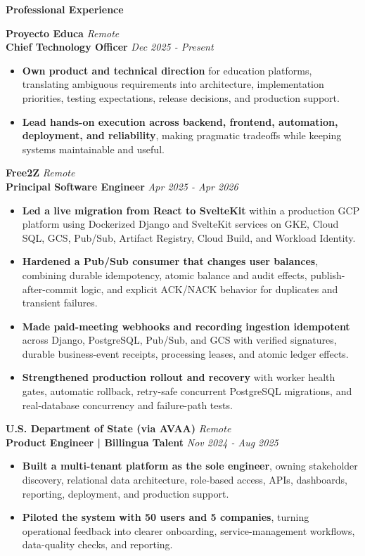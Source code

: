 \documentclass[10pt]{article}
\newcommand{\sectiontitle}[1]{%
    \vspace{3pt}
    \begin{center}
        \textbf{#1}
    \end{center}
    \vspace{-5pt}
}
\begin{document}
\sectiontitle{Professional Experience}
\textbf{Proyecto Educa} \hfill \textit{Remote} \\
\textbf{Chief Technology Officer} \hfill \textit{Dec 2025 - Present}
\begin{itemize}
    \item \textbf{Own product and technical direction} for education platforms, translating ambiguous requirements into architecture, implementation priorities, testing expectations, release decisions, and production support.
    \item \textbf{Lead hands-on execution across backend, frontend, automation, deployment, and reliability}, making pragmatic tradeoffs while keeping systems maintainable and useful.
\end{itemize}

\vspace{1pt}
\textbf{Free2Z} \hfill \textit{Remote} \\
\textbf{Principal Software Engineer} \hfill \textit{Apr 2025 - Apr 2026}
\begin{itemize}
    \item \textbf{Led a live migration from React to SvelteKit} within a production GCP platform using Dockerized Django and SvelteKit services on GKE, Cloud SQL, GCS, Pub/Sub, Artifact Registry, Cloud Build, and Workload Identity.
    \item \textbf{Hardened a Pub/Sub consumer that changes user balances}, combining durable idempotency, atomic balance and audit effects, publish-after-commit logic, and explicit ACK/NACK behavior for duplicates and transient failures.
    \item \textbf{Made paid-meeting webhooks and recording ingestion idempotent} across Django, PostgreSQL, Pub/Sub, and GCS with verified signatures, durable business-event receipts, processing leases, and atomic ledger effects.
    \item \textbf{Strengthened production rollout and recovery} with worker health gates, automatic rollback, retry-safe concurrent PostgreSQL migrations, and real-database concurrency and failure-path tests.
\end{itemize}

\vspace{1pt}
\textbf{U.S. Department of State (via AVAA)} \hfill \textit{Remote} \\
\textbf{Product Engineer | Billingua Talent} \hfill \textit{Nov 2024 - Aug 2025}
\begin{itemize}
    \item \textbf{Built a multi-tenant platform as the sole engineer}, owning stakeholder discovery, relational data architecture, role-based access, APIs, dashboards, reporting, deployment, and production support.
    \item \textbf{Piloted the system with 50 users and 5 companies}, turning operational feedback into clearer onboarding, service-management workflows, data-quality checks, and reporting.
\end{itemize}
\end{document}
